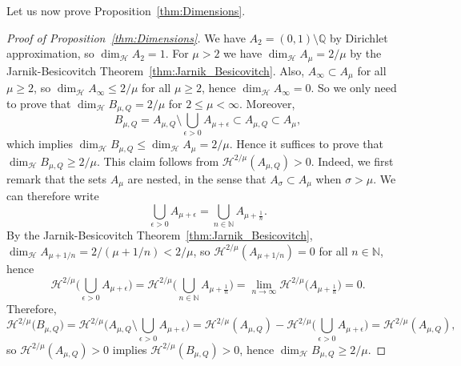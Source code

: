 \documentclass[11pt,reqno]{amsart}
\theoremstyle{definition}
\begin{document}
Let us now prove Proposition~\ref{thm:Dimensions}. 
\begin{proof}[Proof of Proposition~\ref{thm:Dimensions}]
We have $A_2 = (0,1) \setminus \mathbb Q $ by Dirichlet approximation, so $\operatorname{dim}_{\mathcal H} A_2 = 1$. 
For $\mu > 2$ we have $\operatorname{dim}_{\mathcal H} A_\mu = 2/\mu$ by the Jarnik-Besicovitch Theorem~\ref{thm:Jarnik_Besicovitch}. 
Also, $A_\infty \subset A_\mu$ for all $\mu \geq 2$, 
so $\operatorname{dim}_{\mathcal H} A_\infty \leq 2/\mu$ 
for all $\mu \geq 2$,
hence $\operatorname{dim}_{\mathcal H} A_\infty = 0$. 
So we only need to prove that $\operatorname{dim}_{\mathcal H} B_{\mu,Q} = 2/\mu$ for $2 \leq \mu < \infty$. 
Moreover, 
\begin{equation}
 B_{\mu,Q} = A_{\mu,Q} \setminus \bigcup_{\epsilon > 0} A_{\mu + \epsilon} \subset  A_{\mu,Q} \subset A_\mu, 
\end{equation}
which implies $\dim_{\mathcal H}  B_{\mu,Q} \leq  \dim_{\mathcal H}  A_\mu = 2/\mu$. 
Hence it suffices to prove that $\operatorname{dim}_{\mathcal H} B_{\mu,Q} \geq 2/\mu$. 
This claim follows 
from $\mathcal H^{2/\mu}( A_{\mu,Q} ) >  0$. 
Indeed, 
we first remark that the sets $A_\mu$ are nested, in the sense that 
$A_{\sigma} \subset A_\mu$ when $\sigma > \mu$.
We can therefore write
\begin{equation}
 \bigcup_{\epsilon > 0} A_{\mu + \epsilon} = \bigcup_{n \in \mathbb N} A_{\mu + \frac{1}{n}}.
\end{equation}
By the Jarnik-Besicovitch Theorem~\ref{thm:Jarnik_Besicovitch}, $\dim_{\mathcal H} A_{\mu +  1/n} = 2/(\mu + 1/n) < 2/\mu$, so $\mathcal H^{2/\mu}(A_{\mu + 1/n}) = 0$ for all $n \in \mathbb N$, 
hence
\begin{equation}
\mathcal H^{2/\mu} \Big( \bigcup_{\epsilon  > 0} A_{\mu + \epsilon} \Big)
= \mathcal H^{2/\mu} \Big( \bigcup_{n \in \mathbb N} A_{\mu + \frac{1}{n}} \Big)
 = \lim_{n \to \infty} \mathcal H^{2/\mu} \big( A_{\mu + \frac{1}{n}} \big) = 0. 
\end{equation}
Therefore, 
\begin{equation}
\mathcal H^{2/\mu} \big( B_{\mu,Q} \big)
= \mathcal H^{2/\mu} \Big(  A_{\mu,Q} \setminus \bigcup_{\epsilon > 0} A_{\mu + \epsilon} \Big) = \mathcal H^{2/\mu} (  A_{\mu,Q}  )  - \mathcal H^{2/\mu} \Big( \bigcup_{\epsilon  > 0} A_{\mu + \epsilon} \Big)
= \mathcal H^{2/\mu} \left(  A_{\mu,Q}  \right),  
\end{equation}
so $\mathcal H^{2/\mu}( A_{\mu,Q}) > 0$ implies $\mathcal H^{2/\mu}( B_{\mu,Q}) > 0$,
hence  $\dim_{\mathcal H}  B_{\mu,Q} \geq 2/\mu$. 


\end{proof}
\end{document}
